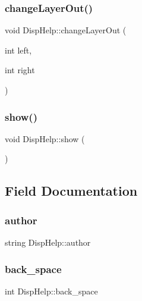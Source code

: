 \subsubsection{\texorpdfstring{changeLayerOut()}{changeLayerOut()}}
{\footnotesize\ttfamily void Disp\+Help\+::change\+Layer\+Out (\begin{DoxyParamCaption}\item[{int}]{left,  }\item[{int}]{right }\end{DoxyParamCaption})}

\mbox{\label{class_disp_help_a774d2c992ef7d5b2655f56e5ef853fa8}} 
\subsubsection{\texorpdfstring{show()}{show()}}
{\footnotesize\ttfamily void Disp\+Help\+::show (\begin{DoxyParamCaption}{ }\end{DoxyParamCaption})}



\subsection{Field Documentation}
\mbox{\label{class_disp_help_a2f80e2435d81a237a78d86211edac8c0}} 
\subsubsection{\texorpdfstring{author}{author}}
{\footnotesize\ttfamily string Disp\+Help\+::author\hspace{0.3cm}{\ttfamily [private]}}

\mbox{\label{class_disp_help_a228d10b41c871e9ecabf3ea829c54496}} 
\subsubsection{\texorpdfstring{back\_space}{back\_space}}
{\footnotesize\ttfamily int Disp\+Help\+::back\+\_\+space\hspace{0.3cm}{\ttfamily [private]}}

